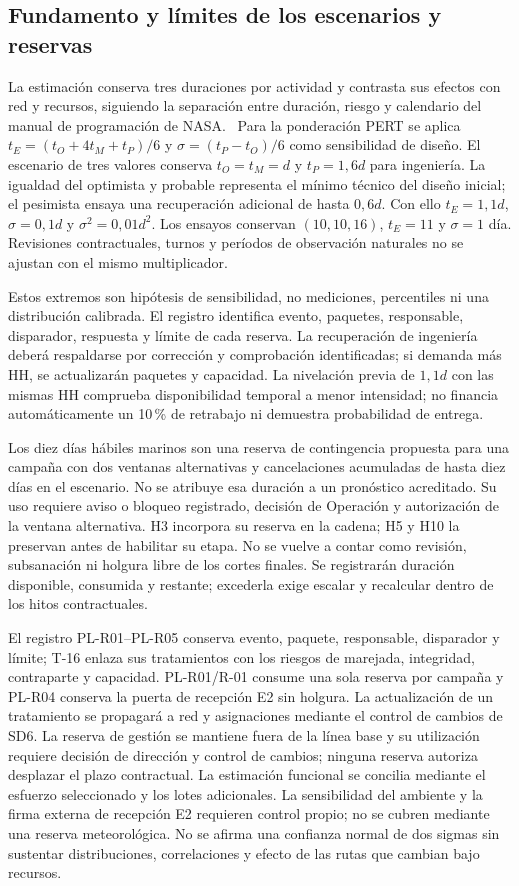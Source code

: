 \subsection{Fundamento y límites de los escenarios y reservas}
La estimación conserva tres duraciones por actividad y contrasta sus efectos con red y recursos, siguiendo la separación entre duración, riesgo y calendario del manual de programación de NASA.~\parencite[secc.~6.3.1 y 7.4, pp.~38--40 y 59--60]{nasa-cronograma} Para la ponderación PERT se aplica $t_E=(t_O+4t_M+t_P)/6$ y $\sigma=(t_P-t_O)/6$ como sensibilidad de diseño. El escenario de tres valores conserva $t_O=t_M=d$ y $t_P=1,6d$ para ingeniería. La igualdad del optimista y probable representa el mínimo técnico del diseño inicial; el pesimista ensaya una recuperación adicional de hasta $0,6d$. Con ello $t_E=1,1d$, $\sigma=0,1d$ y $\sigma^2=0,01d^2$. Los ensayos conservan $(10,10,16)$, $t_E=11$ y $\sigma=1$ día. Revisiones contractuales, turnos y períodos de observación naturales no se ajustan con el mismo multiplicador.

Estos extremos son hipótesis de sensibilidad, no mediciones, percentiles ni una distribución calibrada. El registro  identifica evento, paquetes, responsable, disparador, respuesta y límite de cada reserva. La recuperación de ingeniería deberá respaldarse por corrección y comprobación identificadas; si demanda más HH, se actualizarán paquetes y capacidad. La nivelación previa de $1,1d$ con las mismas HH comprueba disponibilidad temporal a menor intensidad; no financia automáticamente un 10\,\% de retrabajo ni demuestra probabilidad de entrega.

Los diez días hábiles marinos son una reserva de contingencia propuesta para una campaña con dos ventanas alternativas y cancelaciones acumuladas de hasta diez días en el escenario. No se atribuye esa duración a un pronóstico acreditado. Su uso requiere aviso o bloqueo registrado, decisión de Operación y autorización de la ventana alternativa. H3 incorpora su reserva en la cadena; H5 y H10 la preservan antes de habilitar su etapa. No se vuelve a contar como revisión, subsanación ni holgura libre de los cortes finales. Se registrarán duración disponible, consumida y restante; excederla exige escalar y recalcular dentro de los hitos contractuales.

El registro PL-R01--PL-R05 conserva evento, paquete, responsable, disparador y límite; T-16 enlaza sus tratamientos con los riesgos de marejada, integridad, contraparte y capacidad. PL-R01/R-01 consume una sola reserva por campaña y PL-R04 conserva la puerta de recepción E2 sin holgura. La actualización de un tratamiento se propagará a red y asignaciones mediante el control de cambios de SD6. La reserva de gestión se mantiene fuera de la línea base y su utilización requiere decisión de dirección y control de cambios; ninguna reserva autoriza desplazar el plazo contractual. La estimación funcional se concilia mediante el esfuerzo seleccionado y los lotes adicionales. La sensibilidad del ambiente y la firma externa de recepción E2 requieren control propio; no se cubren mediante una reserva meteorológica. No se afirma una confianza normal de dos sigmas sin sustentar distribuciones, correlaciones y efecto de las rutas que cambian bajo recursos.
